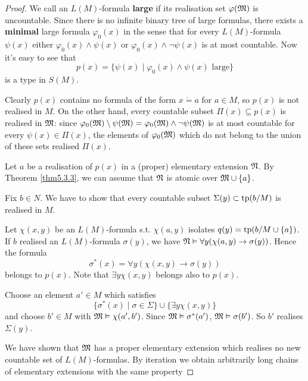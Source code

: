 \documentclass[11pt]{article}
\begin{document}
\begin{proof}
We call an \(L(M)\)-formula \textbf{large} if its realisation set \(\varphi(\mathfrak{M})\) is uncountable. Since there is
no infinite binary tree of large formulas, there exists a \textbf{minimal} large formula
\(\varphi_0(x)\) in the sense that for every \(L(M)\)-formula \(\psi(x)\) either \(\varphi_0(x)\wedge\psi(x)\)
or \(\varphi_0(x)\wedge\neg\psi(x)\) is at most countable. Now it's easy to see that
\begin{equation*}
p(x)=\{\psi(x)\mid\varphi_0(x)\wedge\psi(x)\text{ large}\}
\end{equation*}
is a type in \(S(M)\).

Clearly \(p(x)\) contains no formula of the form \(x\dot{=}a\) for \(a\in M\), so \(p(x)\) is not
realised in \(M\). On the other hand, every countable subset \(\Pi(x)\subseteq p(x)\) is realised
in \(\mathfrak{M}\): since \(\varphi_0(\mathfrak{M})\setminus\psi(\mathfrak{M})=\varphi_0(\mathfrak{M})\wedge\neg\psi(\mathfrak{M})\) is at most countable for every \(\psi(x)\in\Pi(x)\), the
elements of \(\varphi_0(\mathfrak{M})\) which do not belong to the union of these sets realised \(\Pi(x)\).

Let \(a\) be a realisation of \(p(x)\) in a (proper) elementary extension \(\mathfrak{N}\). By Theorem
\ref{thm5.3.3}, we can assume that \(\mathfrak{N}\) is atomic over \(\mathfrak{M}\cup\{a\}\).

Fix \(b\in N\). We have to show that every countable subset \(\Sigma(y)\subset\operatorname{tp}(b/M)\) is realised
in \(M\).

Let \(\chi(x,y)\) be an \(L(M)\)-formula s.t. \(\chi(a,y)\) isolates \(q(y)=\operatorname{tp}(b/M\cup\{a\})\). If \(b\)
realised an \(L(M)\)-formula \(\sigma(y)\), we have \(\mathfrak{N}\vDash\forall y(\chi(a,y)\to\sigma(y))\). Hence the formula
\begin{equation*}
\sigma^*(x)=\forall y(\chi(x,y)\to\sigma(y))
\end{equation*}
belongs to \(p(x)\). Note that \(\exists y\chi(x,y)\) belongs also to \(p(x)\).

Choose an element \(a'\in M\) which satisfies
\begin{equation*}
\{\sigma^*(x)\mid\sigma\in\Sigma\}\cup\{\exists y\chi(x,y)\}
\end{equation*}
and choose \(b'\in M\) with \(\mathfrak{M}\vDash\chi(a',b')\). Since \(\mathfrak{M}\vDash\sigma^*(a')\), \(\mathfrak{M}\vDash\sigma(b')\). So \(b'\)
realises \(\Sigma(y)\).

We have shown that \(\mathfrak{M}\) has a proper elementary extension which realises no new countable set
of \(L(M)\)-formulas. By iteration we obtain arbitrarily long chains of elementary extensions
with the same property
\end{proof}
\end{document}
